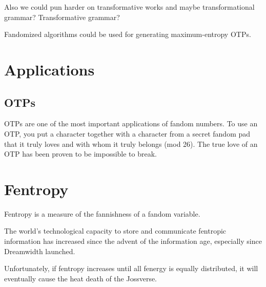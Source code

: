 \documentclass[9pt]{sigplanconf}
\begin{document}
Also we could pun harder on transformative works and maybe transformational
grammar? Transformative grammar?

Fandomized algorithms could be used for generating maximum-entropy OTPs.

\section{Applications}

\subsection{OTPs}

OTPs are one of the most important applications of fandom numbers.  To
use an OTP, you put a character together with a character from a
secret fandom pad that it truly loves and with whom it truly belongs
(mod 26).  The true love of an OTP has been proven to be impossible to
break.

\section{Fentropy}

Fentropy is a measure of the fannishness of a fandom variable.

The world's technological capacity to store and communicate fentropic
information has increased since the advent of the information age,
especially since Dreamwidth launched.

Unfortunately, if fentropy increases until all fenergy is equally
distributed, it will eventually cause the heat death of the Jossverse.



\end{document}
